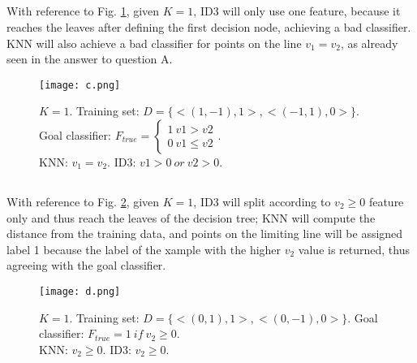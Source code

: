 %


\subsection{}
With reference to Fig. \ref{Q2_c}, given $K=1$, ID3 will only use one feature, because it reaches the leaves after defining the first decision node, achieving a bad classifier. KNN will also achieve a bad classifier for points on the line $v_{1}=v_{2}$, as already seen in the answer to question A.

\begin{figure}[H]
    \centering
    \texttt{[image: c.png]}
    \caption{$K=1$. Training set: $D=\{<(1,-1),1>,<(-1,1),0>\}$. Goal classifier: $F_{true}=\begin{cases}1\ v1>v2\\0\ v1\leq v2\end{cases}$.\\ KNN: $v_{1}=v_{2}$. ID3: $v1>0\ or\ v2>0$.}
    \label{Q2_c}
\end{figure}

%

\subsection{}
With reference to Fig. \ref{Q2_d}, given $K=1$, ID3 will split according to $v_2\geq0$ feature only and thus reach the leaves of the decision tree; KNN will compute the distance from the training data, and points on the limiting line will be assigned label 1 because the label of the xample with the higher $v_2$ value is returned, thus agreeing with the goal classifier.

\begin{figure}[H]
    \centering
    \texttt{[image: d.png]}
    \caption{$K=1$. Training set: $D=\{<(0,1),1>,<(0,-1),0>\}$. Goal classifier: $F_{true}=1\ if\ v_{2}\geq0$.\\ KNN: $v_{2}\geq0$. ID3: $v_{2}\geq0$.}
    \label{Q2_d}
\end{figure}


